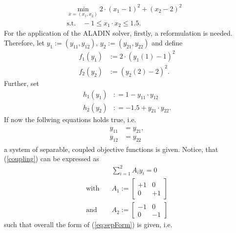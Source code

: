 \documentclass[]{scrartcl}
\begin{document}
\begin{align*}
\min_{x = (x_1, x_2)} 2\cdot (x_1 - 1)^2 + (x_2 - 2)^2 &\\
\text{s.t.} \quad-1 \leq x_1 \cdot x_2 \leq 1.5.&
\end{align*}
For the application of the ALADIN solver, firstly, a reformulation is needed. Therefore, let $y_1 := (y_{11}, y_{12})$, $y_2 := (y_{21}, y_{22})$ and define
\begin{align*}
f_1(y_1) & := 2 \cdot (y_1(1) - 1 )^2 \\
f_2(y_2) & := (y_2(2) - 2)^2.
\end{align*}
Further, set
\begin{align*}
h_1(y_1) & : = 1 - y_{11} \cdot y_{12} \\
h_2(y_2) & : = -1.5 + y_{21} \cdot y_{22}.
\end{align*}
If now the follwing equations holds true, i.e.
\begin{align}\label{coupling}
\begin{aligned}
y_{11}  &= y_{21},\\
y_{12}  &= y_{22}
\end{aligned}
\end{align}
a system of separable, coupled objective functions is given. Notice, that (\ref{coupling}) can be expressed as
\begin{align*}
&\sum_{i = 1}^2 A_i y_i = 0 \\
\text{with} \quad & A_1 := \begin{bmatrix} +1 & 0 \\ 0 & +1 \end{bmatrix} \\
\text{and} \quad  & A_2 := \begin{bmatrix} -1 & 0 \\ 0 & -1 \end{bmatrix}
\end{align*}
such that overall the form of (\ref{eq:sepForm}) is given, i.e.
\end{document}
